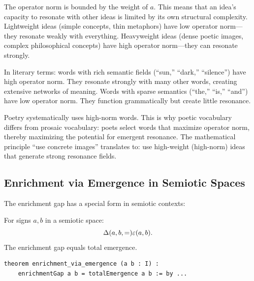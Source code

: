 \begin{interpretation}
The operator norm is bounded by the weight of $a$. This means that an idea's
capacity to resonate with other ideas is limited by its own structural complexity.
Lightweight ideas (simple concepts, thin metaphors) have low operator norm---they
resonate weakly with everything. Heavyweight ideas (dense poetic images, complex
philosophical concepts) have high operator norm---they can resonate strongly.

In literary terms: words with rich semantic fields (``sun,'' ``dark,'' ``silence'')
have high operator norm. They resonate strongly with many other words, creating
extensive networks of meaning. Words with sparse semantics (``the,'' ``is,''
``and'') have low operator norm. They function grammatically but create little
resonance.

Poetry systematically uses high-norm words. This is why poetic vocabulary differs
from prosaic vocabulary: poets select words that maximize operator norm, thereby
maximizing the potential for emergent resonance. The mathematical principle
``use concrete images'' translates to: use high-weight (high-norm) ideas that
generate strong resonance fields.
\end{interpretation}

\subsection{Enrichment via Emergence in Semiotic Spaces}

The enrichment gap has a special form in semiotic contexts:

\begin{theorem}
\label{thm:enrichment-via-emergence-signs}
For signs $a, b$ in a semiotic space:
\[
  \Delta(a,b,=) \varepsilon(a, b).
\]
The enrichment gap equals total emergence.
\end{theorem}

\begin{lstlisting}[caption={Enrichment via emergence (IDT\_v3\_Emergence.lean)}]
theorem enrichment_via_emergence (a b : I) :
    enrichmentGap a b = totalEmergence a b := by ...
\end{lstlisting}

